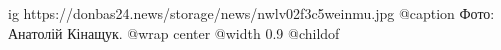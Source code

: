  
 
 
 
 

\ifcmt
  ig https://donbas24.news/storage/news/nwlv02f3c5weinmu.jpg
  @caption Фото: Анатолій Кінащук.
  @wrap center
  @width 0.9
  @childof 
\fi
